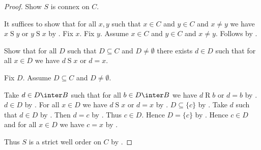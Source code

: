 \begin{proof}
    Show $S$ is connex on $C$.
    \begin{subproof}
        It suffices to show that for all $x,y$ such that $x\in C$ and $y\in C$ and $x\neq y$
            we have $x\mathrel{S}y$ or $y\mathrel{S}x$ by .
        Fix $x$.
        Fix $y$.
        Assume $x\in C$ and $y\in C$ and $x\neq y$.
        Follows by .
    \end{subproof}

    Show that for all $D$ such that $D\subseteq C$ and $D\neq\emptyset$
        there exists $d\in D$ such that for all $x\in D$ we have $d\mathrel{S}x$ or $d=x$.
    \begin{subproof}
        Fix $D$.
        Assume $D\subseteq C$ and $D\neq\emptyset$.
        \begin{byCase}
            Take $d\in D\inter B$ such that for all $b\in D\inter B$
                we have $d\mathrel{R}b$ or $d=b$
                by .
            $d\in D$ by .
            For all $x\in D$ we have $d\mathrel{S}x$ or $d=x$
                by .
            $D\subseteq\{c\}$ by .
            Take $d$ such that $d\in D$ by .
            Then $d=c$ by .
            Thus $c\in D$.
            Hence $D=\{c\}$ by .
            Hence $c\in D$ and for all $x\in D$ we have $c=x$ by .
        \end{byCase}
    \end{subproof}

    Thus $S$ is a strict well order on $C$ by .


\end{proof}
